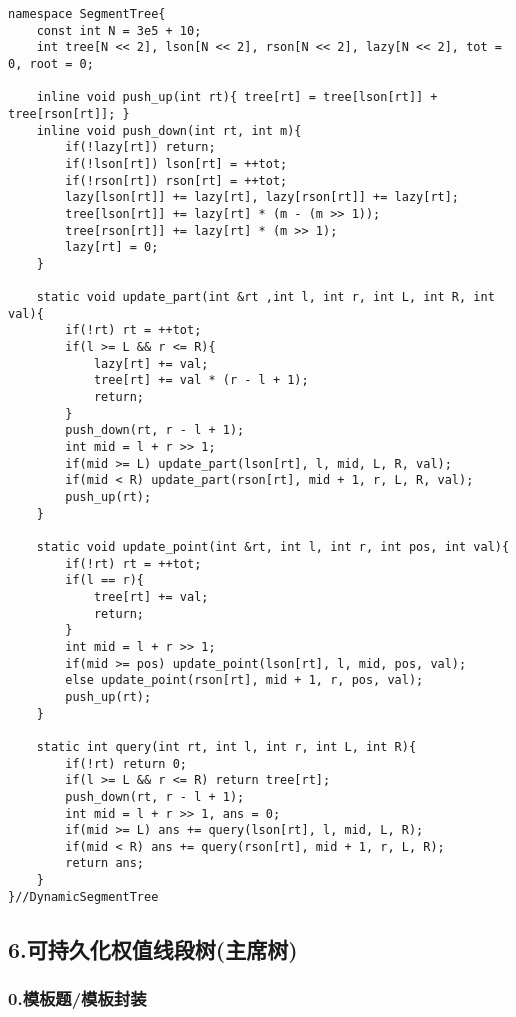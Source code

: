 \documentclass[]{article}
\begin{document}
\begin{verbatim}
namespace SegmentTree{
    const int N = 3e5 + 10;
    int tree[N << 2], lson[N << 2], rson[N << 2], lazy[N << 2], tot = 0, root = 0;

    inline void push_up(int rt){ tree[rt] = tree[lson[rt]] + tree[rson[rt]]; }
    inline void push_down(int rt, int m){
        if(!lazy[rt]) return;
        if(!lson[rt]) lson[rt] = ++tot;
        if(!rson[rt]) rson[rt] = ++tot;
        lazy[lson[rt]] += lazy[rt], lazy[rson[rt]] += lazy[rt];
        tree[lson[rt]] += lazy[rt] * (m - (m >> 1));
        tree[rson[rt]] += lazy[rt] * (m >> 1);
        lazy[rt] = 0;
    }

    static void update_part(int &rt ,int l, int r, int L, int R, int val){
        if(!rt) rt = ++tot;
        if(l >= L && r <= R){
            lazy[rt] += val;
            tree[rt] += val * (r - l + 1);
            return;
        }
        push_down(rt, r - l + 1);
        int mid = l + r >> 1;
        if(mid >= L) update_part(lson[rt], l, mid, L, R, val);
        if(mid < R) update_part(rson[rt], mid + 1, r, L, R, val);
        push_up(rt);
    }

    static void update_point(int &rt, int l, int r, int pos, int val){
        if(!rt) rt = ++tot;
        if(l == r){
            tree[rt] += val;
            return;
        }
        int mid = l + r >> 1;
        if(mid >= pos) update_point(lson[rt], l, mid, pos, val);
        else update_point(rson[rt], mid + 1, r, pos, val);
        push_up(rt);
    }

    static int query(int rt, int l, int r, int L, int R){
        if(!rt) return 0;
        if(l >= L && r <= R) return tree[rt];
        push_down(rt, r - l + 1);
        int mid = l + r >> 1, ans = 0;
        if(mid >= L) ans += query(lson[rt], l, mid, L, R);
        if(mid < R) ans += query(rson[rt], mid + 1, r, L, R);
        return ans;
    }
}//DynamicSegmentTree
\end{verbatim}

\hypertarget{ux53efux6301ux4e45ux5316ux6743ux503cux7ebfux6bb5ux6811ux4e3bux5e2dux6811}{%
\subsection{6.可持久化权值线段树(主席树)}\label{ux53efux6301ux4e45ux5316ux6743ux503cux7ebfux6bb5ux6811ux4e3bux5e2dux6811}}

\hypertarget{ux6a21ux677fux9898ux6a21ux677fux5c01ux88c5}{%
\subsubsection{0.模板题/模板封装}\label{ux6a21ux677fux9898ux6a21ux677fux5c01ux88c5}}
\end{document}
